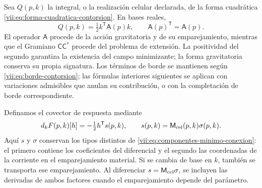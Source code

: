 Sea \(Q(p,k)\) la integral, o la realización celular declarada, de
la forma cuadrática
\eqref{vii:eq:forma-cuadratica-contorsion}. En bases reales,
\begin{equation}
 Q(p,k)=\tfrac12 k^{\mathsf T}\mathsf A(p)k,
 \qquad \mathsf A(p)^{\mathsf T}=\mathsf A(p).
 \label{vii:eq:cuadratica-celular-contorsion}
\end{equation}
El operador \(\mathsf A\) procede de la acción gravitatoria y de
su emparejamiento, mientras que el Gramiano
\(\mathsf C\mathsf C^*\) procede del problema de extensión.
La positividad del segundo garantiza la existencia del campo
minimizante; la forma gravitatoria conserva su propia signatura.
Los términos de borde se mantienen según
\eqref{vii:eq:borde-contorsion}; las fórmulas interiores siguientes
se aplican con variaciones admisibles que anulan su contribución, o
con la completación de borde correspondiente.

Definamos el covector de respuesta mediante
\begin{equation}
 d_kF(p,k)[h]= -\tfrac12 h^{\mathsf T}s(p,k),
 \qquad s(p,k)=\mathsf M_{\rm cel}(p,k)\sigma(p,k).
 \label{vii:eq:covector-torsional-minimo}
\end{equation}
Aquí \(s\) y \(\sigma\) conservan los tipos distintos de
\eqref{vii:eq:componentes-minimo-conexion}: el primero contiene los
coeficientes del diferencial y el segundo las coordenadas de la
corriente en el emparejamiento material. Si se cambia de base en
\(k\), también se transporta ese emparejamiento. Al diferenciar
\(s=\mathsf M_{\rm cel}\sigma\), se incluyen las derivadas de
ambos factores cuando el emparejamiento depende del parámetro.

